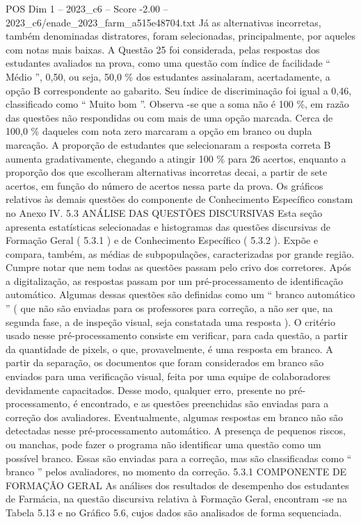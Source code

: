 \begin{textsample}{POS Dim 1 – 2023\_c6 – Score -2.00 – 2023\_c6/enade\_2023\_farm\_a515e48704.txt}
Já as alternativas incorretas, também denominadas distratores, foram selecionadas, principalmente, por aqueles com notas mais baixas.
A Questão 25 foi considerada, pelas respostas dos estudantes avaliados na prova, como uma questão com índice de facilidade “ Médio ”, 0,50, ou seja, 50,0 \% dos estudantes assinalaram, acertadamente, a opção B correspondente ao gabarito.
Seu índice de discriminação foi igual a 0,46, classificado como “ Muito bom ”.
Observa -se que a soma não é 100 \%, em razão das questões não respondidas ou com mais de uma opção marcada.
Cerca de 100,0 \% daqueles com nota zero marcaram a opção em branco ou dupla marcação.
A proporção de estudantes que selecionaram a resposta correta B aumenta gradativamente, chegando a atingir 100 \% para 26 acertos, enquanto a proporção dos que escolheram alternativas incorretas decai, a partir de sete acertos, em função do número de acertos nessa parte da prova.
Os gráficos relativos às demais questões do componente de Conhecimento Específico constam no Anexo IV. 5.3 ANÁLISE DAS QUESTÕES DISCURSIVAS Esta seção apresenta estatísticas selecionadas e histogramas das questões discursivas de Formação Geral ( 5.3.1 ) e de Conhecimento Específico ( 5.3.2 ).
Expõe e compara, também, as médias de subpopulações, caracterizadas por grande região.
Cumpre notar que nem todas as questões passam pelo crivo dos corretores.
Após a digitalização, as respostas passam por um pré-processamento de identificação automático.
Algumas dessas questões são definidas como um “ branco automático ” ( que não são enviadas para os professores para correção, a não ser que, na segunda fase, a de inspeção visual, seja constatada uma resposta ).
O critério usado nesse pré-processamento consiste em verificar, para cada questão, a partir da quantidade de pixels, o que, provavelmente, é uma resposta em branco.
A partir da separação, os documentos que foram considerados em branco são enviados para uma verificação visual, feita por uma equipe de colaboradores devidamente capacitados.
Desse modo, qualquer erro, presente no pré-processamento, é encontrado, e as questões preenchidas são enviadas para a correção dos avaliadores.
Eventualmente, algumas respostas em branco não são detectadas nesse pré-processamento automático.
A presença de pequenos riscos, ou manchas, pode fazer o programa não identificar uma questão como um possível branco.
Essas são enviadas para a correção, mas são classificadas como “ branco ” pelos avaliadores, no momento da correção. 5.3.1 COMPONENTE DE FORMAÇÃO GERAL As análises dos resultados de desempenho dos estudantes de Farmácia, na questão discursiva relativa à Formação Geral, encontram -se na Tabela 5.13 e no Gráfico 5.6, cujos dados são analisados de forma sequenciada.

\end{textsample}
